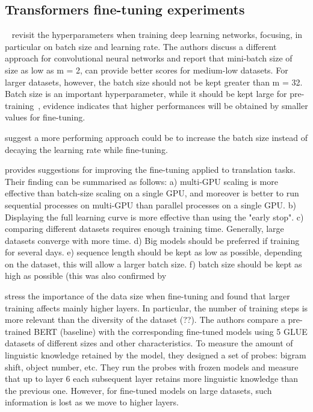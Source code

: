\subsection{Transformers fine-tuning experiments}

~\cite{dominic2018revisiting} revisit the hyperparameters when training deep learning networks, focusing, in particular on batch size and learning rate. The authors discuss a different approach for convolutional neural networks and report that mini-batch size of size as low as m = 2, can provide better scores for medium-low datasets. For larger datasets, however, the batch size should not be kept greater than m = 32. 
Batch size is an important hyperparameter, while it should be kept large for pre-training~\cite{liu2019roberta}, evidence indicates that higher performances will be obtained by smaller values for fine-tuning. 

\cite{smith2017dont} suggest a more performing approach could be to increase the batch size instead of decaying the learning rate while fine-tuning. 

\cite{popel2018training} provides suggestions for improving the fine-tuning applied to translation tasks. Their finding can be summarised as follows: a) multi-GPU scaling is more effective than batch-size scaling on a single GPU, and moreover is better to run sequential processes on multi-GPU than parallel processes on a single GPU. b) Displaying the full learning curve is more effective than using the "early stop". c) comparing different datasets requires enough training time. Generally, large datasets converge with more time. 
d) Big models should be preferred if training for several days. e) sequence length should be kept as low as possible, depending on the dataset, this will allow a larger batch size. f) batch size should be kept as high as possible (this was also confirmed by \cite{liu2019roberta}

\cite{mehrafarin2022on} stress the importance of the data size when fine-tuning and found that larger training affects mainly higher layers. In particular, the number of training steps is more relevant than the diversity of the dataset (??). 
The authors compare a pre-trained BERT (baseline) with the corresponding fine-tuned models using 5 GLUE datasets of different sizes and other characteristics.
To measure the amount of linguistic knowledge retained by the model, they designed a set of probes: bigram shift, object number, etc. They run the probes with frozen models and measure that up to layer 6 each subsequent layer retains more linguistic knowledge than the previous one. However, for fine-tuned models on large datasets, such information is lost as we move to higher layers. 

